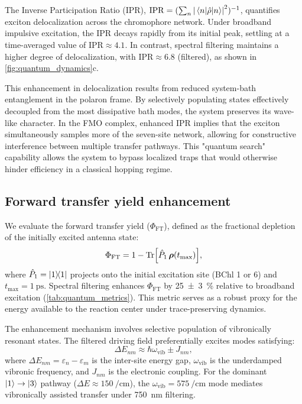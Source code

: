 \documentclass[journal=jpcl,manuscript=letter]{achemso}
\begin{document}
The Inverse Participation Ratio (IPR), $\mathrm{IPR} = (\sum_n \abs{\mel{n}{\hat{\rho}}{n}}^2)^{-1}$, quantifies exciton delocalization across the chromophore network. Under broadband impulsive excitation, the IPR decays rapidly from its initial peak, settling at a time-averaged value of $\mathrm{IPR} \approx 4.1$. In contrast, spectral filtering maintains a higher degree of delocalization, with $\mathrm{IPR} \approx 6.8$ (filtered), as shown in \cref{fig:quantum_dynamics}c. 

This enhancement in delocalization results from reduced system-bath entanglement in the polaron frame. By selectively populating states effectively decoupled from the most dissipative bath modes, the system preserves its wave-like character. In the FMO complex, enhanced IPR implies that the exciton simultaneously samples more of the seven-site network, allowing for constructive interference between multiple transfer pathways. This "quantum search" capability allows the system to bypass localized traps that would otherwise hinder efficiency in a classical hopping regime.

\subsection{Forward transfer yield enhancement}

We evaluate the forward transfer yield ($\Phi_{\mathrm{FT}}$), defined as the fractional depletion of the initially excited antenna state:
\begin{equation}
\Phi_{\mathrm{FT}} = 1 - \Tr[\hat{P}_{1}\,\vb*{\rho}(t_{\max})],
\label{eq:ETE}
\end{equation}
where $\hat{P}_{1} = \dyad{1}$ projects onto the initial excitation site (BChl 1 or 6) and $t_{\max} = \SI{1}{\pico\second}$. Spectral filtering enhances $\Phi_{\mathrm{FT}}$ by \SI{25(3)}{\percent} relative to broadband excitation (\cref{tab:quantum_metrics}). This metric serves as a robust proxy for the energy available to the reaction center under trace-preserving dynamics.

The enhancement mechanism involves selective population of vibronically resonant states. The filtered driving field preferentially excites modes satisfying:
\begin{equation}
\Delta E_{nm} \approx \hbar\omega_{\mathrm{vib}} \pm J_{nm},
\label{eq:resonance_condition}
\end{equation}
where $\Delta E_{nm} = \varepsilon_n - \varepsilon_m$ is the inter-site energy gap, $\omega_{\mathrm{vib}}$ is the underdamped vibronic frequency, and $J_{nm}$ is the electronic coupling. For the dominant $\ket{1} \to \ket{3}$ pathway ($\Delta E \approx \SI{150}{\per\centi\meter}$), the $\omega_{\mathrm{vib}} = \SI{575}{\per\centi\meter}$ mode mediates vibronically assisted transfer under \SI{750}{\nano\meter} filtering.\cite{Chin2013}
\end{document}
